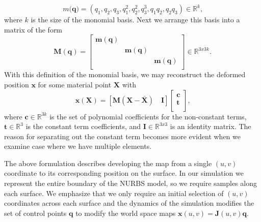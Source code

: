 \begin{equation}
m(\mathbf{q)} = (
					q_1, q_2, q_3,
                   	q_1^2, q_2^2, q_3^3,
                   	q_1 q_2, q_2 q_3
                ) \in \mathbb{R}^k
                \text{,}
\end{equation}
where $k$ is the size of the monomial basis. Next we arrange this basis into a matrix of the form
\begin{equation}
\mathbf{M}(\mathbf{q}) = \left[ \begin{array}{ccc}
\mathbf{m}(\mathbf{q}) &  &  \\
 & \mathbf{m}(\mathbf{q})  &  \\
 &  & \mathbf{m}(\mathbf{q})  \\
\end{array} \right] \in \mathbb{R}^{3x3k}
\text{.}
\end{equation}
With this definition of the monomial basis, we may reconstruct the deformed position $\mathbf{x}$ for some material point $\mathbf{X}$ with
\begin{equation}
\mathbf{x}(\mathbf{X}) = \left[\mathbf{M}(\mathbf{X-\bar{X}}) \quad \mathbf{I} \right]
\left[ \begin{array}{c}
\mathbf{c} \\
\mathbf{t} \\
\end{array} \right]
\text{,}
\end{equation}
where $\mathbf{c} \in \mathbb{R}^{3k}$ is the set of polynomial coefficients for the non-constant terms, $\mathbf{t} \in \mathbb{R}^3$ is the constant term coefficients, and $\mathbf{I} \in \mathbb{R}^{3x3}$ is an identity matrix. The reason for separating out the constant term becomes more evident when we examine case where we have multiple elements.

The above formulation describes developing the map from a single $(u,v)$ coordinate to its corresponding position on the surface. In our simulation we represent the entire boundary of the NURBS model, so we require samples along each surface. We emphasize that we only require an initial selection of $(u,v)$ coordinates across each surface and the dynamics of the simulation modifies the set of control points $\mathbf{q}$ to modify the world space maps $\mathbf{x}(u,v)=\mathbf{J}(u,v)\mathbf{q}$.

